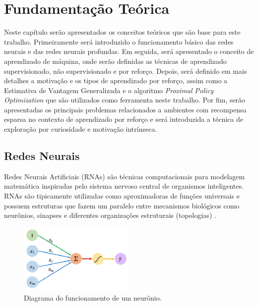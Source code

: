 \chapter{Fundamentação Teórica}
\label{cap:fundamentacao}
Neste capítulo serão apresentados os conceitos teóricos que são base para este trabalho. Primeiramente será introduzido o funcionamento básico das redes neurais e das redes neurais profundas. Em seguida, será apresentado o conceito de aprendizado de máquina, onde serão definidas as técnicas de aprendizado supervisionado, não supervisionado e por reforço. Depois, será definido em mais detalhes a motivação e os tipos de aprendizado por reforço, assim como a Estimativa de Vantagem Generalizada e o algoritmo \textit{Proximal Policy Optimization} que são utilizados como ferramenta neste trabalho. Por fim, serão apresentadas os principais problemas relacionados a ambientes com recompensa esparsa no contexto de aprendizado por reforço e será introduzida a técnica de exploração por curiosidade e motivação intrínseca.


\section{Redes Neurais}
\label{sec:redesneurais}

Redes Neurais Artificiais (RNAs) são técnicas computacionais para modelagem matemática inspiradas pelo sistema nervoso central de organismos inteligentes. RNAs são tipicamente utilizadas como aproximadoras de funções universais e possuem estruturas que fazem um paralelo entre mecanismos biológicos como neurônios, sinapses e diferentes organizações estruturais (topologias) \cite{Russel}. 


\begin{figure}[ht]
 \centering
  \includegraphics[width=0.5\textwidth]{./fig/Neuron}
  \caption{Diagrama do funcionamento de um neurônio.}
 \label{fig:neuron}
\end{figure}

